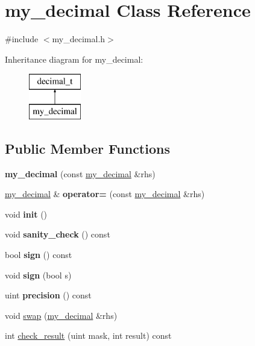 \hypertarget{classmy__decimal}{}\section{my\+\_\+decimal Class Reference}
\label{classmy__decimal}


{\ttfamily \#include $<$my\+\_\+decimal.\+h$>$}

Inheritance diagram for my\+\_\+decimal\+:\begin{figure}[H]
\begin{center}
\leavevmode
\includegraphics[height=2.000000cm]{classmy__decimal}
\end{center}
\end{figure}
\subsection*{Public Member Functions}
\begin{DoxyCompactItemize}
\item 
\mbox{\label{classmy__decimal_a97984df13f29c1a3cd973c2c0cfcf085}} 
{\bfseries my\+\_\+decimal} (const \mbox{\hyperlink{classmy__decimal}{my\+\_\+decimal}} \&rhs)
\item 
\mbox{\label{classmy__decimal_abd730fefce3bbca2ca09147a23cdf513}} 
\mbox{\hyperlink{classmy__decimal}{my\+\_\+decimal}} \& {\bfseries operator=} (const \mbox{\hyperlink{classmy__decimal}{my\+\_\+decimal}} \&rhs)
\item 
\mbox{\label{classmy__decimal_a4856fa82097895baf8fc129ce11d6af0}} 
void {\bfseries init} ()
\item 
\mbox{\label{classmy__decimal_a645025e85b426937df704b7a0e11b13a}} 
void {\bfseries sanity\+\_\+check} () const
\item 
\mbox{\label{classmy__decimal_ad4f214f01673e331e6cbaed08f02fe77}} 
bool {\bfseries sign} () const
\item 
\mbox{\label{classmy__decimal_a10cce4b3e0fbe456975103ea04dacd41}} 
void {\bfseries sign} (bool s)
\item 
\mbox{\label{classmy__decimal_a9c312c8e168b021c80c85a0b3b9f69ae}} 
uint {\bfseries precision} () const
\item 
void \mbox{\hyperlink{classmy__decimal_af4c268a43bd0a237c9f147950af907fb}{swap}} (\mbox{\hyperlink{classmy__decimal}{my\+\_\+decimal}} \&rhs)
\item 
int \mbox{\hyperlink{classmy__decimal_a9fc01f08993732970194ffb50c041028}{check\+\_\+result}} (uint mask, int result) const
\end{DoxyCompactItemize}


